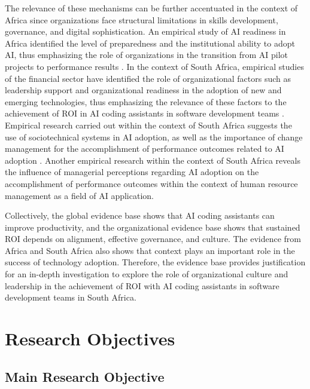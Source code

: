 \documentclass[11pt]{report}
\begin{document}
The relevance of these mechanisms can be further accentuated in the context of Africa since organizations face structural limitations in skills development, governance, and digital sophistication. An empirical study of AI readiness in Africa identified the level of preparedness and the institutional ability to adopt AI, thus emphasizing the role of organizations in the transition from AI pilot projects to performance results \autocite{Isagah2024}. In the context of South Africa, empirical studies of the financial sector have identified the role of organizational factors such as leadership support and organizational readiness in the adoption of new and emerging technologies, thus emphasizing the relevance of these factors to the achievement of ROI in AI coding assistants in software development teams \autocite{Matsepe2022}. Empirical research carried out within the context of South Africa suggests the use of sociotechnical systems in AI adoption, as well as the importance of change management for the accomplishment of performance outcomes related to AI adoption \autocite{Smit2024}. Another empirical research within the context of South Africa reveals the influence of managerial perceptions regarding AI adoption on the accomplishment of performance outcomes within the context of human resource management as a field of AI application.

Collectively, the global evidence base shows that AI coding assistants can improve productivity, and the organizational evidence base shows that sustained ROI depends on alignment, effective governance, and culture. The evidence from Africa and South Africa also shows that context plays an important role in the success of technology adoption. Therefore, the evidence base provides justification for an in-depth investigation to explore the role of organizational culture and leadership in the achievement of ROI with AI coding assistants in software development teams in South Africa.

\chapter*{Research Objectives}

\section{Main Research Objective}
\label{sec:Main Research Objective}
\end{document}
